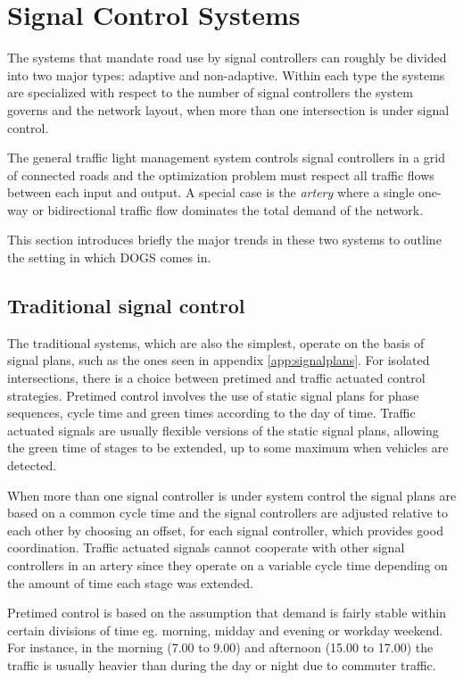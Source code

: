 \section{Signal Control Systems}
\label{systems}
The systems that mandate road use by signal controllers can roughly be divided into two major types: adaptive and non-adaptive. Within each type the systems are specialized with respect to the number of signal controllers the system governs and the network layout, when more than one intersection is under signal control. 

The general traffic light management system controls signal controllers in a grid of connected roads and the optimization problem must respect all traffic flows between each input and output. A special case is the \textit{artery} where a single one-way or bidirectional traffic flow dominates the total demand of the network.

This section introduces briefly the major trends in these two systems to outline the setting in which DOGS comes in.

\subsection{Traditional signal control}

The traditional systems, which are also the simplest, operate on the basis of signal plans, such as the ones seen in appendix \ref{app:signalplans}. For isolated intersections, there is a choice between pretimed and traffic actuated control strategies. Pretimed control involves the use of static signal plans for phase sequences, cycle time and green times according to the day of time. Traffic actuated signals are usually flexible versions of the static signal plans, allowing the green time of stages to be extended, up to some maximum when vehicles are detected.

When more than one signal controller is under system control the signal plans are based on a common cycle time and the signal controllers are adjusted relative to each other by choosing an offset, for each signal controller, which provides good coordination. Traffic actuated signals cannot cooperate with other signal controllers in an artery since they operate on a variable cycle time depending on the amount of time each stage was extended.

Pretimed control is based on the assumption that demand is fairly stable within certain divisions of time eg. morning, midday and evening or workday \/ weekend. For instance, in the morning (7.00 to 9.00) and afternoon (15.00 to 17.00) the traffic is usually heavier than during the day or night due to  commuter traffic.

